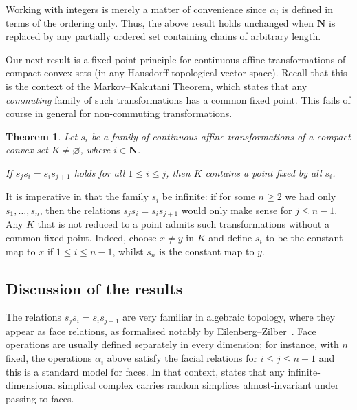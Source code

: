 \documentclass[12pt, pdflatex]{amsart}
\newtheorem{itheorem}{Theorem} %
\theoremstyle{definition}
\numberwithin{equation}{section}
\numberwithin{theorem}{section}
\newcommand{\NN}{\mathbf{N}}
\begin{document}
Working with integers is merely a matter of convenience since $\alpha_i$ is defined in terms of the ordering only. Thus, the above result holds unchanged when $\NN$ is replaced by %
any partially ordered set containing chains of arbitrary length. %

\bigskip

Our next result is a fixed-point principle for continuous affine transformations of compact convex sets (in any Hausdorff topological vector space). Recall that this is the context of the Markov--Kakutani Theorem, which states that any \emph{commuting} family of such transformations has a common fixed point. This fails of course in general for non-commuting transformations.

\begin{itheorem}\label{thm:fixed-pt}
Let $s_i$ be a family of continuous affine transformations of a compact convex set $K\neq\varnothing$, where $i\in\NN$.

\nopagebreak
If $s_j s_i = s_i s_{j+1}$ holds for all $1\leq i \leq j$, then $K$ contains a point fixed by all $s_i$.
\end{itheorem}


It is imperative in  that the family $s_i$ be infinite: if for some $n\geq 2$ we had only $s_1, \ldots, s_n$, then the relations  $s_j s_i = s_i s_{j+1}$ would only make sense for $j\leq n-1$. Any $K$ that is not reduced to a point admits such transformations without a common fixed point. Indeed, choose $x\neq y$ in $K$ and define $s_i$ to be the constant map to $x$ if $1\leq i \leq n-1$, whilst $s_n$ is the constant map to $y$.

\subsection*{Discussion of the results}
The relations $s_j s_i = s_i s_{j+1}$ are very familiar in algebraic topology, where they appear as face relations, as formalised notably by Eilenberg--Zilber~\cite{Eilenberg-Zilber50}. Face operations are usually defined separately in every dimension; for instance, with $n$ fixed, the operations $\alpha_i$ above satisfy the facial relations for  $i\leq j\leq n-1$ and this is a standard model for faces. In that context,  states that any infinite-dimensional simplical complex carries random simplices almost-invariant under passing to faces.
\end{document}
